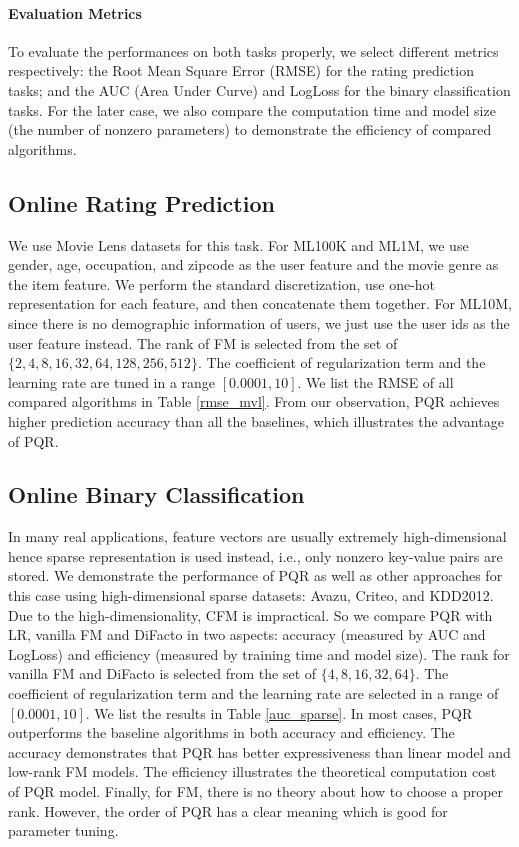 \documentclass[letterpaper]{article} %
\theoremstyle{plain}
\theoremstyle{definition}
\begin{document}
\paragraph{Evaluation Metrics} To evaluate the performances on both tasks properly, we select different metrics respectively: the Root Mean Square Error (RMSE) for the rating prediction tasks; and the AUC (Area Under Curve) and LogLoss for the binary classification tasks. For the later case, we also compare the computation time and model size (the number of nonzero parameters) to demonstrate the efficiency of compared algorithms.

\subsection{Online Rating Prediction}

We use Movie Lens datasets for this task. For ML100K and ML1M, we use gender, age, occupation, and zipcode as the user feature and the movie genre as the item feature. We perform the standard discretization, use one-hot representation for each feature, and then concatenate them together. For ML10M, since there is no demographic information of users, we just use the user ids as the user feature instead.  The rank of FM is selected from the set of $\{2, 4, 8, 16, 32, 64, 128, 256, 512\}$. The coefficient of regularization term and the learning rate are tuned in a range $[0.0001, 10]$. We list the RMSE of all compared algorithms in Table \ref{rmse_mvl}. From our observation, PQR achieves higher prediction accuracy than all the baselines, which illustrates the advantage of PQR.

\subsection{Online Binary Classification}

In many real applications, feature vectors are usually extremely high-dimensional hence sparse representation is used instead, i.e., only nonzero key-value pairs are stored. We demonstrate the performance of PQR as well as other approaches for this case using high-dimensional sparse datasets: Avazu, Criteo, and KDD2012. Due to the high-dimensionality, CFM is impractical. So we compare PQR with LR, vanilla FM and DiFacto in two aspects: accuracy (measured by AUC and LogLoss) and efficiency (measured by training time and model size).  The rank for vanilla FM and DiFacto is selected from the set of $\{4, 8, 16, 32, 64\}$. The coefficient of regularization term and the learning rate are selected in a range of $[0.0001, 10]$. We list the results in Table \ref{auc_sparse}. In most cases, PQR outperforms the baseline algorithms in both accuracy and efficiency. The accuracy demonstrates that PQR has better expressiveness than linear model and low-rank FM models. The efficiency illustrates the theoretical computation cost of PQR model. Finally, for FM, there is no theory about how to choose a proper rank. However, the order of PQR has a clear meaning which is good for parameter tuning.
\end{document}
